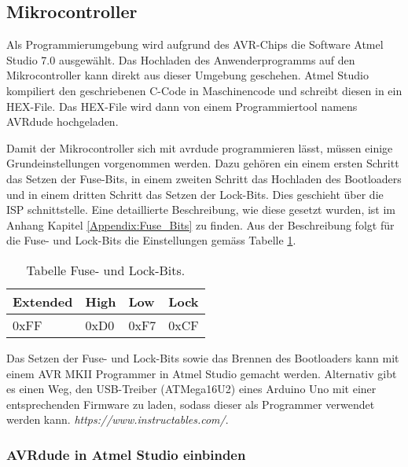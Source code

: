 \subsection{Mikrocontroller}
\label{subsec:Inbetriebnahme_Mikrocontroller}

Als Programmierumgebung wird aufgrund des AVR-Chips die Software Atmel Studio 7.0 ausgewählt. Das Hochladen des Anwenderprogramms auf den Mikrocontroller kann direkt aus dieser Umgebung geschehen. 
Atmel Studio kompiliert den geschriebenen C-Code in Maschinencode und schreibt diesen in ein HEX-File. Das HEX-File wird dann von einem Programmiertool namens AVRdude hochgeladen.\cite{verschiedene_autoren_avrdude_2019}

Damit der Mikrocontroller sich mit avrdude programmieren lässt, müssen einige Grundeinstellungen vorgenommen werden. Dazu gehören ein einem ersten Schritt das Setzen der Fuse-Bits, in einem zweiten Schritt das Hochladen des Bootloaders und in einem dritten Schritt das Setzen der Lock-Bits. Dies geschieht über die ISP schnittstelle. Eine detaillierte Beschreibung, wie diese gesetzt wurden, ist im Anhang Kapitel \ref{Appendix:Fuse_Bits} zu finden. Aus der Beschreibung folgt für die Fuse- und Lock-Bits die Einstellungen gemäss Tabelle \ref{tab:Fuse_und_Lock-Bits}.

\begin{table}[h!]
\center
\begin{tabular}{|l|l|l|l|}
\hline
\textbf{Extended} & \textbf{High} & \textbf{Low} & \textbf{Lock}\\
\hline
0xFF & 0xD0 & 0xF7 & 0xCF\\
\hline
\end{tabular}
\caption{Tabelle Fuse- und Lock-Bits.}
\label{tab:Fuse_und_Lock-Bits}
\end{table}

Das Setzen der Fuse- und Lock-Bits sowie das Brennen des Bootloaders kann mit einem AVR MKII Programmer in Atmel Studio gemacht werden. Alternativ gibt es einen Weg, den USB-Treiber (ATMega16U2) eines Arduino Uno mit einer entsprechenden Firmware zu laden, sodass dieser als Programmer verwendet werden kann. \textit{https://www.instructables.com/}. \cite{vidmofollow_turn_2017}

\subsubsection{AVRdude in Atmel Studio einbinden}\label{subsubsec:avrdude_in_atmelstudio_einbinden}


